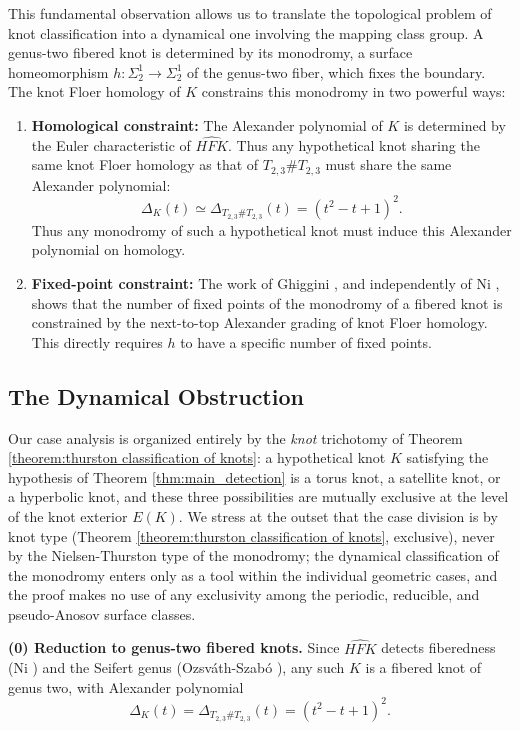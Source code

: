 This fundamental observation allows us to translate the topological problem of knot classification into a dynamical one involving the mapping class group. A genus-two fibered knot is determined by its monodromy, a surface homeomorphism $h \colon \Sigma_2^1 \to \Sigma_2^1$ of the genus-two fiber, which fixes the boundary. The knot Floer homology of $K$ constrains this monodromy in two powerful ways:
\begin{enumerate}
    \item \textbf{Homological constraint:} The Alexander polynomial of $K$ is determined by the Euler characteristic of $\widehat{HFK}$. Thus any hypothetical knot sharing the same knot Floer homology as that of $T_{2,3}\# T_{2,3}$ must share the same Alexander polynomial:
    \[
    \Delta_K(t) \simeq \Delta_{T_{2,3}\# T_{2,3}}(t) = (t^2 - t + 1)^2.
    \]
    Thus any monodromy of such a hypothetical knot must induce this Alexander polynomial on homology.
    \item \textbf{Fixed-point constraint:} The work of Ghiggini \cite{Ghi08}, and independently of Ni \cite{Ni07}, shows that the number of fixed points of the monodromy of a fibered knot is constrained by the next-to-top Alexander grading of knot Floer homology. This directly requires $h$ to have a specific number of fixed points.
\end{enumerate}


\subsection{The Dynamical Obstruction}
Our case analysis is organized entirely by the \emph{knot} trichotomy of Theorem \ref{theorem:thurston classification of knots}: a hypothetical knot $K$ satisfying the hypothesis of Theorem \ref{thm:main_detection} is a torus knot, a satellite knot, or a hyperbolic knot, and these three possibilities are mutually exclusive at the level of the knot exterior $E(K)$. We stress at the outset that the case division is by knot type (Theorem \ref{theorem:thurston classification of knots}, exclusive), never by the Nielsen-Thurston type of the monodromy; the dynamical classification of the monodromy enters only as a tool within the individual geometric cases, and the proof makes no use of any exclusivity among the periodic, reducible, and pseudo-Anosov surface classes.

\textbf{(0) Reduction to genus-two fibered knots.} Since $\widehat{HFK}$ detects fiberedness (Ni \cite{Ni07}) and the Seifert genus (Ozsv\'{a}th-Szab\'{o} \cite{OS-genus}), any such $K$ is a fibered knot of genus two, with Alexander polynomial
\[
\Delta_K(t) = \Delta_{T_{2,3}\# T_{2,3}}(t) = (t^2 - t + 1)^2.
\]

